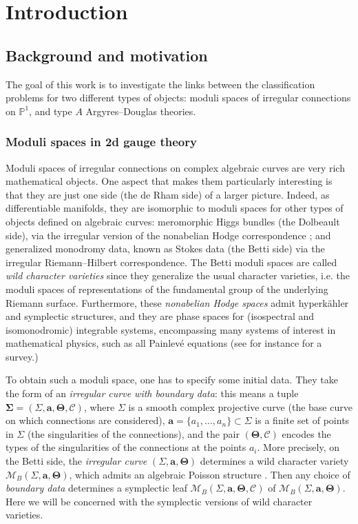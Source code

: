 \documentclass[11pt,a4paper]{amsart}
\numberwithin{equation}{section}
\begin{document}
\tableofcontents

\section{Introduction}


\subsection{Background and motivation} The goal of this work is to investigate the links between the classification problems for two different types of objects: moduli spaces of irregular connections on $\mathbb P^1$, and type $A$ Argyres--Douglas theories. 

\subsubsection{Moduli spaces in 2d gauge theory} 

Moduli spaces of irregular connections on complex algebraic curves are very rich mathematical objects. One aspect that makes them particularly interesting is that they are just one side (the de Rham side) of a larger picture. Indeed, as differentiable manifolds, they are isomorphic to moduli spaces for other types of objects defined on algebraic curves: meromorphic Higgs bundles (the Dolbeault side), via the irregular version of the nonabelian Hodge correspondence \cite{sabbah1999harmonic, biquard2004wild}; and generalized monodromy data, known as Stokes data (the Betti side) via the irregular Riemann--Hilbert correspondence. The Betti moduli spaces are called \emph{wild character varieties} since they generalize the usual character varieties, i.e. the moduli spaces of representations of the fundamental group of the underlying Riemann surface.  Furthermore, these \emph{nonabelian Hodge spaces} admit hyperkähler and symplectic structures, and they are phase spaces for (isospectral and isomonodromic) integrable systems, encompassing many systems of interest in mathematical physics, such as all Painlevé equations (see for instance \cite{boalch2018wild} for a survey.)

To obtain such a moduli space, one has to specify some initial data. They take the form of an \emph{irregular curve with boundary data}: this means a tuple $\bm\Sigma=(\Sigma, \mathbf a,\bm\Theta,\bm{\mathcal C})$, where $\Sigma$ is a smooth complex projective curve (the base curve on which connections are considered), $\mathbf a =\{a_1, \dots, a_n\}\subset \Sigma$ is a finite set of points in $\Sigma$ (the singularities of the connections), and the pair $(\bm\Theta, \bm{\mathcal C})$ encodes the types of the singularities of the connections at the points $a_i$. More precisely, on the Betti side, the \emph{irregular curve} $(\Sigma, \mathbf a,\bm\Theta)$ determines a wild character variety $\mathcal M_ B(\Sigma, \mathbf a,\bm\Theta)$, which admits an algebraic Poisson structure \cite{boalch2014geometry, boalch2015twisted}. Then any choice of \emph{boundary data}  determines a symplectic leaf $\mathcal M_B(\Sigma, \mathbf a,\bm\Theta,\bm{\mathcal C})$ of $\mathcal M_ B(\Sigma, \mathbf a,\bm\Theta)$. Here we will be concerned with the symplectic versions of wild character varieties. 
\end{document}
